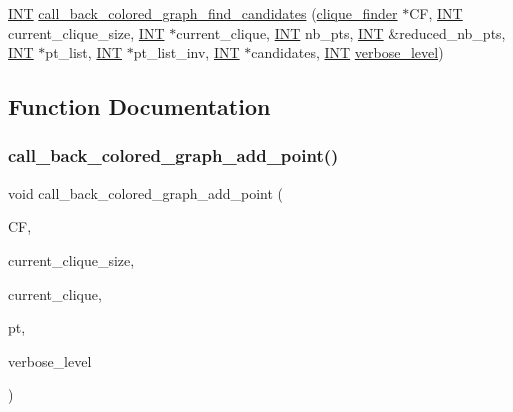 \begin{DoxyCompactItemize}
\item 
\mbox{\hyperlink{galois_8h_a09fddde158a3a20bd2dcadb609de11dc}{I\+NT}} \mbox{\hyperlink{rainbow__cliques_8_c_ac65506da6701dee30f21f03457d89987}{call\+\_\+back\+\_\+colored\+\_\+graph\+\_\+find\+\_\+candidates}} (\mbox{\hyperlink{classclique__finder}{clique\+\_\+finder}} $\ast$CF, \mbox{\hyperlink{galois_8h_a09fddde158a3a20bd2dcadb609de11dc}{I\+NT}} current\+\_\+clique\+\_\+size, \mbox{\hyperlink{galois_8h_a09fddde158a3a20bd2dcadb609de11dc}{I\+NT}} $\ast$current\+\_\+clique, \mbox{\hyperlink{galois_8h_a09fddde158a3a20bd2dcadb609de11dc}{I\+NT}} nb\+\_\+pts, \mbox{\hyperlink{galois_8h_a09fddde158a3a20bd2dcadb609de11dc}{I\+NT}} \&reduced\+\_\+nb\+\_\+pts, \mbox{\hyperlink{galois_8h_a09fddde158a3a20bd2dcadb609de11dc}{I\+NT}} $\ast$pt\+\_\+list, \mbox{\hyperlink{galois_8h_a09fddde158a3a20bd2dcadb609de11dc}{I\+NT}} $\ast$pt\+\_\+list\+\_\+inv, \mbox{\hyperlink{galois_8h_a09fddde158a3a20bd2dcadb609de11dc}{I\+NT}} $\ast$candidates, \mbox{\hyperlink{galois_8h_a09fddde158a3a20bd2dcadb609de11dc}{I\+NT}} \mbox{\hyperlink{simeon_8_c_a818073fbcc2f439e7c56952f67386122}{verbose\+\_\+level}})
\end{DoxyCompactItemize}


\subsection{Function Documentation}
\mbox{\label{rainbow__cliques_8_c_adbbbaff1d90e06bf0b1b59cd1b0a596e}} 
\subsubsection{\texorpdfstring{call\+\_\+back\+\_\+colored\+\_\+graph\+\_\+add\+\_\+point()}{call\_back\_colored\_graph\_add\_point()}}
{\footnotesize\ttfamily void call\+\_\+back\+\_\+colored\+\_\+graph\+\_\+add\+\_\+point (\begin{DoxyParamCaption}\item[{\mbox{\hyperlink{classclique__finder}{clique\+\_\+finder}} $\ast$}]{CF,  }\item[{\mbox{\hyperlink{galois_8h_a09fddde158a3a20bd2dcadb609de11dc}{I\+NT}}}]{current\+\_\+clique\+\_\+size,  }\item[{\mbox{\hyperlink{galois_8h_a09fddde158a3a20bd2dcadb609de11dc}{I\+NT}} $\ast$}]{current\+\_\+clique,  }\item[{\mbox{\hyperlink{galois_8h_a09fddde158a3a20bd2dcadb609de11dc}{I\+NT}}}]{pt,  }\item[{\mbox{\hyperlink{galois_8h_a09fddde158a3a20bd2dcadb609de11dc}{I\+NT}}}]{verbose\+\_\+level }\end{DoxyParamCaption})}

